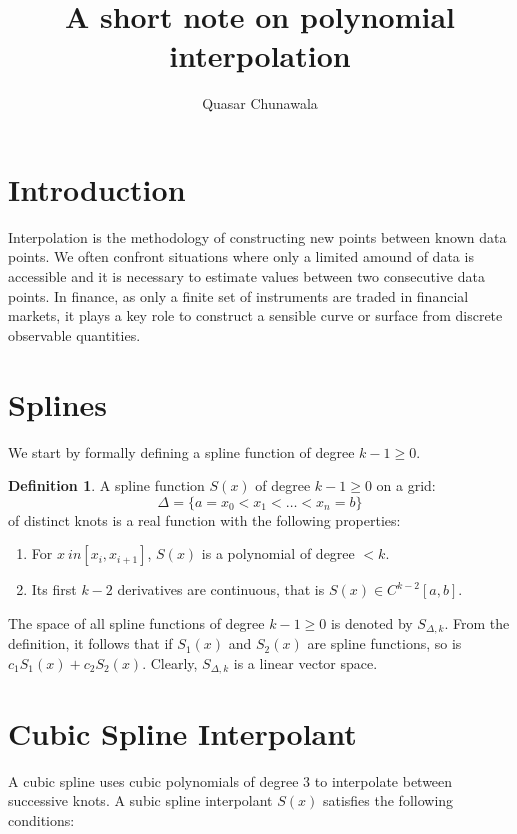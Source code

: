 \documentclass{article}
\title{A short note on polynomial interpolation}
\author{Quasar Chunawala}
\theoremstyle{definition}
\newtheorem{definition}{Definition}[section]
\begin{document}
\maketitle

\section{Introduction}

Interpolation is the methodology of constructing new points between known data points. We often confront situations where only a limited amound of data is accessible and it is necessary to estimate values between two consecutive data points. In finance, as only a finite set of instruments are traded in financial markets, it plays a key role to construct a sensible curve or surface from discrete observable quantities. 

\section{Splines}

We start by formally defining a spline function of degree $k - 1 \geq 0$. 

\begin{definition}
    A spline function $S(x)$ of degree $k - 1 \geq 0$ on a grid: 
    $$
    \Delta = \{a = x_0 < x_1 < \ldots < x_n = b\}
    $$
    of distinct knots is a real function with the following properties:
    \begin{enumerate}
        \item For $x \ in [x_i, x_{i+1}]$, $S(x)$  is a polynomial of degree $< k$.
        \item Its first $k - 2$ derivatives are continuous, that is $S(x) \in C^{k-2}[a,b]$.
    \end{enumerate}
\end{definition}

The space of all spline functions of degree $k - 1 \geq 0$ is denoted by $S_{\Delta,k}$. From the definition, it follows that if $S_1(x)$ and $S_2(x)$ are spline functions, so is $c_1 S_1(x) + c_2 S_2(x)$. Clearly, $S_{\Delta, k}$ is a linear vector space. 

\section{Cubic Spline Interpolant}

A cubic spline uses cubic polynomials of degree $3$ to interpolate between successive knots. A subic spline interpolant $S(x)$ satisfies the following conditions:
\end{document}
